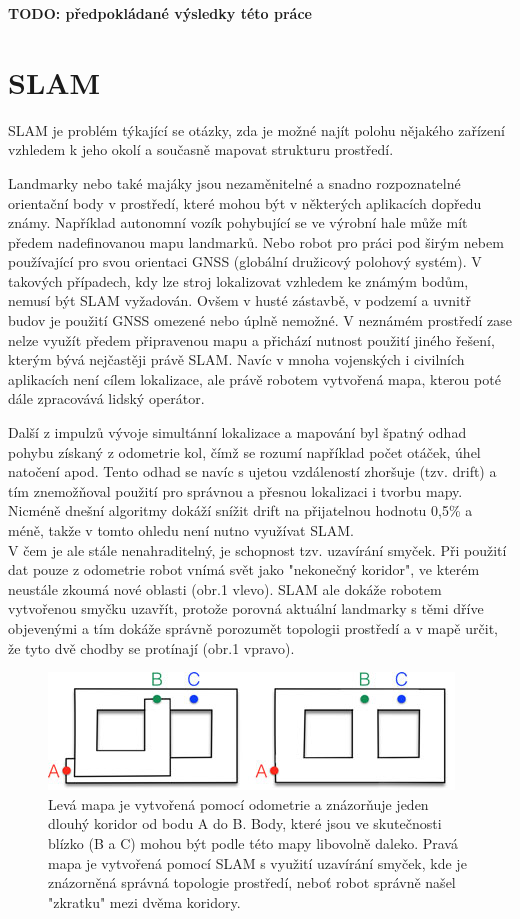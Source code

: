 \documentclass[12pt,a4paper]{article}
\begin{document}
\textbf{TODO: předpokládané výsledky této práce}


\newpage
\section{SLAM}
SLAM je problém týkající se otázky, zda je možné najít polohu nějakého zařízení vzhledem k jeho okolí a současně mapovat strukturu prostředí.

Landmarky nebo také majáky jsou nezaměnitelné a snadno rozpoznatelné orientační body v prostředí, které mohou být v některých aplikacích dopředu známy. Například autonomní vozík pohybující se ve výrobní hale může mít předem nadefinovanou mapu landmarků. Nebo robot pro práci pod širým nebem používající pro svou orientaci GNSS (globální družicový polohový systém). V takových případech, kdy lze stroj lokalizovat vzhledem ke známým bodům, nemusí být SLAM vyžadován. Ovšem v husté zástavbě, v podzemí a uvnitř budov je použití GNSS omezené nebo úplně nemožné. V neznámém prostředí zase nelze využít předem připravenou mapu a přichází nutnost použití jiného řešení, kterým bývá nejčastěji právě SLAM. Navíc v mnoha vojenských i civilních aplikacích není cílem lokalizace, ale právě robotem vytvořená mapa, kterou poté dále zpracovává lidský operátor.

Další z impulzů vývoje simultánní lokalizace a mapování byl špatný odhad pohybu získaný z odometrie kol, čímž se rozumí například počet otáček, úhel natočení apod. Tento odhad se navíc s ujetou vzdáleností zhoršuje (tzv. drift) a tím znemožňoval použití pro správnou a přesnou lokalizaci i tvorbu mapy. Nicméně dnešní algoritmy dokáží snížit drift na přijatelnou hodnotu 0,5\% a méně, takže v tomto ohledu není nutno využívat SLAM. \\ V čem je ale stále nenahraditelný, je schopnost tzv. uzavírání smyček. Při použití dat pouze z odometrie robot vnímá svět jako "nekonečný koridor", ve kterém neustále zkoumá nové oblasti (obr.1 vlevo). SLAM ale dokáže robotem vytvořenou smyčku uzavřít, protože porovná aktuální landmarky s těmi dříve objevenými a tím dokáže správně porozumět topologii prostředí a v mapě určit, že tyto dvě chodby se protínají (obr.1 vpravo).

\begin{figure}[H]
\centering
\includegraphics[scale=1]{Obr1} 
\caption{Levá mapa je vytvořená pomocí odometrie a znázorňuje jeden dlouhý koridor od bodu A do B. Body, které jsou ve skutečnosti blízko (B a C) mohou být podle této mapy libovolně daleko. Pravá mapa je vytvořená pomocí SLAM s využití uzavírání smyček, kde je znázorněná správná topologie prostředí, neboť robot správně našel "zkratku" mezi dvěma koridory.}
\end{figure}
\end{document}
